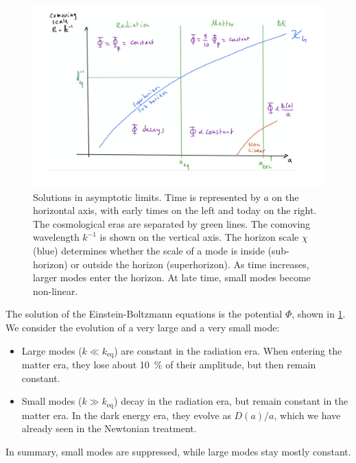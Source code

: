 \begin{figure}
	\centering
	\includegraphics[width=\textwidth]{img/ch-03/asymptotic-behaviour.png}
	\caption{Solutions in asymptotic limits. Time is represented by $a$ on the horizontal axis, with early times on the left and today on the right. The cosmological eras are separated by green lines. The comoving wavelength $k^{-1}$ is shown on the vertical axis. The horizon scale $\chi$ (blue) determines whether the scale of a mode is inside (sub-horizon) or outside the horizon (superhorizon). As time increases, larger modes enter the horizon. At late time, small modes become non-linear.}
	\label{fig:asymptotic-behaviour}
\end{figure}

The solution of the Einstein-Boltzmann equations is the potential $\Phi$, shown in \cref{fig:asymptotic-behaviour}. We consider the evolution of a very large and a very small mode:
\begin{itemize}
	\item Large modes ($k \ll k_\text{eq}$) are constant in the radiation era. When entering the matter era, they lose about \SI{10}{\percent} of their amplitude, but then remain constant.
	\item Small modes ($k\gg k_\text{eq}$) decay in the radiation era, but remain constant in the matter era. In the dark energy era, they evolve as $D(a)/a$, which we have already seen in the Newtonian treatment.
\end{itemize}
In summary, small modes are suppressed, while large modes stay mostly constant.




